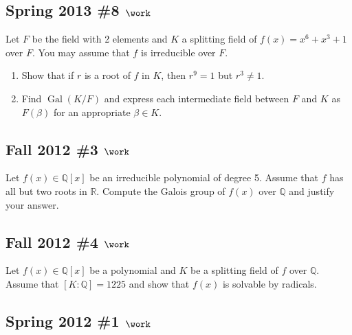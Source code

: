 \hypertarget{spring-2013-8-work}{%
\subsection{\texorpdfstring{Spring 2013 \#8
\(\work\)}{Spring 2013 \#8 \textbackslash work}}\label{spring-2013-8-work}}

Let \(F\) be the field with 2 elements and \(K\) a splitting field of
\(f(x) = x^6 + x^3 + 1\) over \(F\). You may assume that \(f\) is
irreducible over \(F\).

\begin{enumerate}
\def\labelenumi{\alph{enumi}.}
\item
  Show that if \(r\) is a root of \(f\) in \(K\), then \(r^9 = 1\) but
  \(r^3\neq 1\).
\item
  Find \({ \operatorname{Gal}} (K/F)\) and express each intermediate
  field between \(F\) and \(K\) as \(F(\beta)\) for an appropriate
  \(\beta \in K\).
\end{enumerate}

\hypertarget{fall-2012-3-work}{%
\subsection{\texorpdfstring{Fall 2012 \#3
\(\work\)}{Fall 2012 \#3 \textbackslash work}}\label{fall-2012-3-work}}

Let \(f(x) \in {\mathbb{Q}}[x]\) be an irreducible polynomial of degree
5. Assume that \(f\) has all but two roots in \({\mathbb{R}}\). Compute
the Galois group of \(f(x)\) over \({\mathbb{Q}}\) and justify your
answer.

\hypertarget{fall-2012-4-work}{%
\subsection{\texorpdfstring{Fall 2012 \#4
\(\work\)}{Fall 2012 \#4 \textbackslash work}}\label{fall-2012-4-work}}

Let \(f(x) \in {\mathbb{Q}}[x]\) be a polynomial and \(K\) be a
splitting field of \(f\) over \({\mathbb{Q}}\). Assume that
\([K:{\mathbb{Q}}] = 1225\) and show that \(f(x)\) is solvable by
radicals.

\hypertarget{spring-2012-1-work}{%
\subsection{\texorpdfstring{Spring 2012 \#1
\(\work\)}{Spring 2012 \#1 \textbackslash work}}\label{spring-2012-1-work}}

